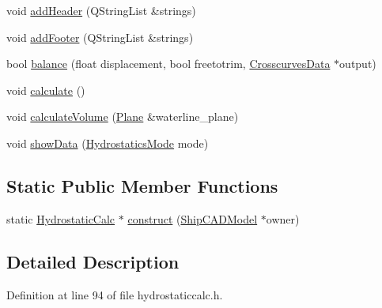 \begin{DoxyCompactItemize}
\item 
void \hyperlink{classShipCAD_1_1HydrostaticCalc_afaf6fb388a37fddf2589ebc0a130a7b1}{add\-Header} (Q\-String\-List \&strings)
\item 
void \hyperlink{classShipCAD_1_1HydrostaticCalc_ac2bb013bb1d79713746d4d458d8f2e91}{add\-Footer} (Q\-String\-List \&strings)
\item 
bool \hyperlink{classShipCAD_1_1HydrostaticCalc_a8c89c1a9f8086eee6efedd41c2ebdcef}{balance} (float displacement, bool freetotrim, \hyperlink{structShipCAD_1_1CrosscurvesData}{Crosscurves\-Data} $\ast$output)
\item 
void \hyperlink{classShipCAD_1_1HydrostaticCalc_aad7665f14049585dafe4a574edd0c3f2}{calculate} ()
\item 
void \hyperlink{classShipCAD_1_1HydrostaticCalc_ac0bd3839af8708eefe77ca3291ebac4a}{calculate\-Volume} (\hyperlink{classShipCAD_1_1Plane}{Plane} \&waterline\-\_\-plane)
\item 
void \hyperlink{classShipCAD_1_1HydrostaticCalc_ae29facc2a65f5317626e7d9bf891c3b7}{show\-Data} (\hyperlink{namespaceShipCAD_a1d3d04d35d63e8a5e44c63183f79200a}{Hydrostatics\-Mode} mode)
\end{DoxyCompactItemize}
\subsection*{Static Public Member Functions}
\begin{DoxyCompactItemize}
\item 
static \hyperlink{classShipCAD_1_1HydrostaticCalc}{Hydrostatic\-Calc} $\ast$ \hyperlink{classShipCAD_1_1HydrostaticCalc_aa2f4609f84ac188e699d6c35c3eb0676}{construct} (\hyperlink{classShipCAD_1_1ShipCADModel}{Ship\-C\-A\-D\-Model} $\ast$owner)
\end{DoxyCompactItemize}


\subsection{Detailed Description}


Definition at line 94 of file hydrostaticcalc.\-h.



